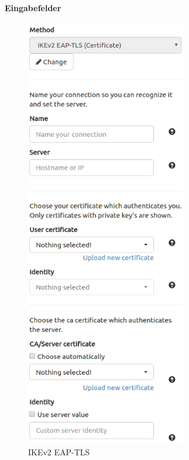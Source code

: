 \noindent\begin{minipage}[t]{0.5\textwidth}
\vspace{0pt}
\paragraph{Eingabefelder}\mbox{}\medskip
    \begin{figure}[H]
    	\centering
    	\includegraphics[width=200pt]{images/ike_eap_tls.png}
    	\caption{IKEv2 EAP-TLS}
    \end{figure}
\end{minipage}
\hfill
